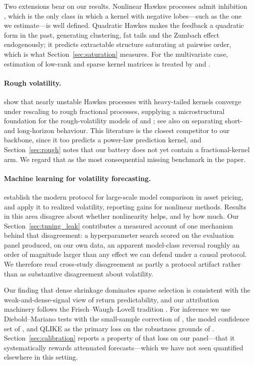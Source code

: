 Two extensions bear on our results. Nonlinear Hawkes processes admit
inhibition \citep{BremaudMassoulie1996}, which is the only class in which a
kernel with negative lobes---such as the one we estimate---is well defined.
Quadratic Hawkes \citep{BlancDonierBouchaud2017} makes the feedback a
quadratic form in the past, generating clustering, fat tails and the Zumbach
effect \citep{Zumbach2009} endogenously; it predicts extractable structure
saturating at pairwise order, which is what Section~\ref{sec:saturation}
measures. For the multivariate case, estimation of low-rank and sparse kernel
matrices is treated by \citet{BacryGaiffasMuzy2015} and
\citet{AchabBacryGaiffas2017}.

\paragraph{Rough volatility.}
\citet{JaissonRosenbaum2016} show that nearly unstable Hawkes processes with
heavy-tailed kernels converge under rescaling to rough fractional processes,
supplying a microstructural foundation for the rough-volatility models of
\citet{GatheralJaissonRosenbaum2018} and \citet{ElEuchRosenbaum2019}; see also
\citet{BennedsenLundePakkanen2022} on separating short- and long-horizon
behaviour. This literature is the closest competitor to our backbone, since it
too predicts a power-law prediction kernel, and Section~\ref{sec:rough} notes
that our battery does not yet contain a fractional-kernel arm. We regard that
as the most consequential missing benchmark in the paper.

\paragraph{Machine learning for volatility forecasting.}
\citet{gu2020empirical} establish the modern protocol for large-scale model
comparison in asset pricing, and \citet{christensen2023machine} apply it to
realized volatility, reporting gains for nonlinear methods. Results in this
area disagree about whether nonlinearity helps, and by how much. Our
Section~\ref{sec:tuning_leak} contributes a measured account of one mechanism
behind that disagreement: a hyperparameter search scored on the evaluation
panel produced, on our own data, an apparent model-class reversal roughly an
order of magnitude larger than any effect we can defend under a causal
protocol. We therefore read cross-study disagreement as partly a protocol
artifact rather than as substantive disagreement about volatility.

Our finding that dense shrinkage dominates sparse selection is consistent with
the weak-and-dense-signal view of return predictability, and our attribution
machinery follows the Frisch--Waugh--Lovell tradition
\citep{FrischWaugh1933, Lovell1963}. For inference we use Diebold--Mariano
tests \citep{DieboldMariano1995} with the small-sample correction of
\citet{HarveyLeybourneNewbold1997}, the model confidence set of
\citet{HansenLundeNason2011}, and QLIKE as the primary loss on the robustness
grounds of \citet{Patton2011}. Section~\ref{sec:calibration} reports a
property of that loss on our panel---that it systematically rewards attenuated
forecasts---which we have not seen quantified elsewhere in this setting.
